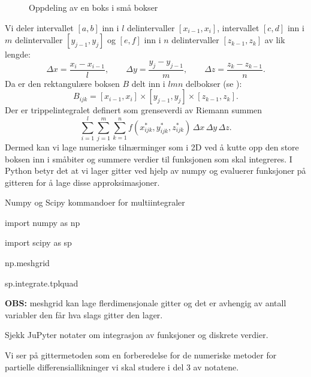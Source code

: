 \begin{figure}[ht]
\caption{Oppdeling av en boks i små bokser}\label{3Dbox}
\end{figure}
Vi deler intervallet \( [a, b] \) inn i \( l \) delintervaller \( [x_{i-1}, x_i] \), intervallet \( [c, d] \) inn i \( m \) delintervaller \( [y_{j-1}, y_j] \) og \( [e, f] \) inn i \( n \) delintervaller \( [z_{k-1}, z_k] \) av lik lengde:
\[
\Delta x = \frac{x_i - x_{i-1}}{l}, \qquad \Delta y = \frac{y_j - y_{j-1}}{m}, \qquad \Delta z = \frac{z_k - z_{k-1}}{n}.
\]
Da er den rektangulære boksen \( B \) delt inn i \( lmn \) delbokser  (se ):
\[
B_{ijk} = [x_{i-1}, x_i] \times [y_{j-1}, y_j] \times [z_{k-1}, z_k].
\]
Der er trippelintegralet definert som grenseverdi av Riemann summen
\[
\sum_{i=1}^{l} \sum_{j=1}^{m} \sum_{k=1}^{n} f(x^{*}_{ijk}, y^{*}_{ijk}, z^{*}_{ijk}) \, \Delta x \, \Delta y \, \Delta z.
\]
Dermed kan vi lage numeriske tilnærminger som i 2D ved å kutte opp den store boksen inn i småbiter og summere verdier til funksjonen som skal integreres.
I Python betyr det at vi lager gitter ved hjelp av numpy og evaluerer funksjoner på gitteren for å lage disse approksimasjoner.

\begin{oppsum}{Numpy og Scipy kommandoer for multiintegraler}

\begin{minipage}{.9\columnwidth}
\begin{lst}{}
import numpy as np

import scipy as sp

np.meshgrid

sp.integrate.tplquad
\end{lst}
\end{minipage}
\textbf{OBS:} meshgrid kan lage flerdimensjonale gitter og det er avhengig av antall variabler den får hva slags gitter den lager.
\end{oppsum}
Sjekk JuPyter notater om integrasjon av funksjoner og diskrete verdier.

Vi ser på gittermetoden som en forberedelse for de numeriske metoder for partielle differensiallikninger vi skal studere i del 3 av notatene.
\newpage
